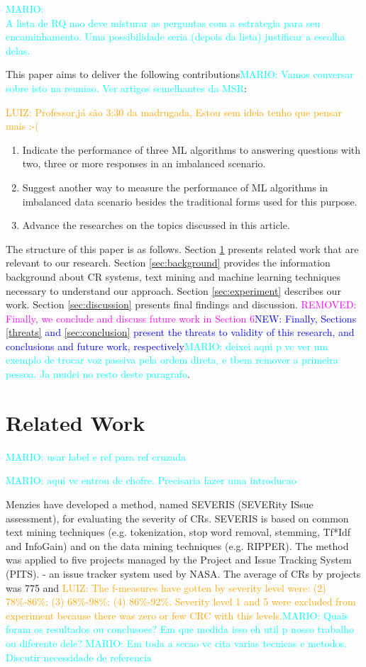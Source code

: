 \documentclass[10pt, conference]{IEEEtran}
\newcommand{\luiz}[1]{\noindent\textcolor{orange}{LUIZ: {#1}}}
\newcommand{\mario}[1]{\noindent\textcolor{cyan}{MARIO: {#1}}}
\newcommand{\rem}[1]{\noindent\textcolor{magenta}{REMOVED: {#1}}}
\newcommand{\new}[1]{\noindent\textcolor{blue}{NEW: {#1}}}
\newcommand{\luiz}[1]{}
\newcommand{\mario}[1]{}
\newcommand{\rem}[1]{}
\newcommand{\new}[1]{#1}
\begin{document}
\mario{\\ A lista de RQ nao deve misturar as perguntas com a estrategia para seu encaminhamento. Uma possibilidade seria (depois da lista) justificar a escolha delas.}

This paper aims to deliver the following contributions\mario{Vamos conversar sobre isto na reuniao. Ver artigos semelhantes da MSR}: 

\luiz{Professor,já são 3:30 da madrugada, Estou sem ideia tenho que pensar mais :-(}
\begin{enumerate}
  \item Indicate the performance of three ML algorithms to answering questions with two, three or more responses in an imbalanced scenario.  
  \item Suggest another way to measure the performance of ML algorithms in imbalanced data scenario besides the traditional forms used for this purpose.
  \item Advance the researches on the topics discussed in this article.
\end{enumerate}

The structure of this paper is as follows. Section \ref{sec:relatedwork} presents related work that are relevant to our research. Section \ref{sec:background} provides the information background about CR systems, text mining and machine learning techniques necessary to understand our approach. Section \ref{sec:experiment} describes our work. Section \ref{sec:discussion} presents final findings and discussion. \rem{Finally, we conclude and discuss future work in Section 6}\new{Finally, Sections \ref{threats} and \ref{sec:conclusion} present the threats to validity of this research, and conclusions and  future work, respectively}\mario{deixei aqui p vc ver um exemplo de trocar voz passiva pela ordem direta, e tbem remover a primeira pessoa. Ja mudei no resto deste paragrafo}.


\section{Related Work}\label{sec:relatedwork} \mario{usar label e ref para ref cruzada}

\mario{aqui vc entrou de chofre. Precisaria fazer uma introducao}

Menzies\cite{Menzies2008} have developed a method, named SEVERIS (SEVERity ISsue assessment), for evaluating the severity of CRs. SEVERIS is based on common text mining techniques (e.g. tokenization, stop word removal, stemming, Tf*Idf and InfoGain) and on the data mining techniques (e.g. RIPPER). The method was applied to five projects managed by the Project and Issue Tracking System (PITS). - an issue tracker system used by NASA. The average of CRs by projects was 775 and \luiz{The f-measures have gotten by severity level were: (2) 78\%-86\%; (3) 68\%-98\%; (4) 86\%-92\%. Severity level 1 and 5 were excluded from experiment because there was zero or few CRC with this levels.}\mario{Quais foram os resultados ou conclusoes? Em que medida isso eh util p nosso trabalho ou diferente dele?} \mario{Em toda a secao vc cita varias tecnicas e metodos. Discutir necessidade de referencia}
\end{document}
